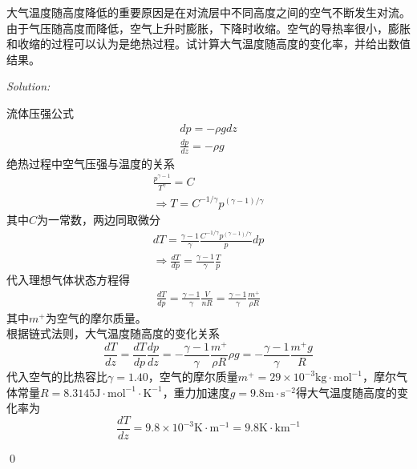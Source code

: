 \documentclass[12pt,a4paper]{article}
\newenvironment{problem}[2][Problem]{\begin{trivlist}
\item[\hskip \labelsep {\bfseries #1}\hskip \labelsep {\bfseries #2.}]}{\end{trivlist}}
\newenvironment{sol}
    {\emph{Solution:}
    }
    {
    \qed
    }
\begin{document}
\begin{problem}{1-11}
大气温度随高度降低的重要原因是在对流层中不同高度之间的空气不断发生对流。由于气压随高度而降低，空气上升时膨胀，下降时收缩。空气的导热率很小，膨胀和收缩的过程可以认为是绝热过程。试计算大气温度随高度的变化率，并给出数值结果。
\end{problem}
\begin{sol}
流体压强公式
\begin{gather}
dp=-\rho gdz\\
\frac{dp}{dz}=-\rho g
\end{gather}
绝热过程中空气压强与温度的关系
\begin{gather}
\frac{p^{\gamma-1}}{T^{\gamma}}=C\\
\Longrightarrow T=C^{-1/\gamma}p^{(\gamma-1)/\gamma}
\end{gather}
其中$C$为一常数，两边同取微分
\begin{gather}
dT=\frac{\gamma-1}{\gamma}\frac{C^{-1/\gamma}p^{(\gamma-1)/\gamma}}{p}dp\\
\Longrightarrow\frac{dT}{dp}=\frac{\gamma-1}{\gamma}\frac{T}{p}
\end{gather}
代入理想气体状态方程得
\begin{gather}
\frac{dT}{dp}=\frac{\gamma-1}{\gamma}\frac{V}{nR}=\frac{\gamma-1}{\gamma}\frac{m^+}{\rho R}
\end{gather}
其中$m^+$为空气的摩尔质量。\\
根据链式法则，大气温度随高度的变化关系
\begin{equation}
\frac{dT}{dz}=\frac{dT}{dp}\frac{dp}{dz}=-\frac{\gamma-1}{\gamma}\frac{m^+}{\rho R}\rho g=-\frac{\gamma-1}{\gamma}\frac{m^+g}{R}
\end{equation}
代入空气的比热容比$\gamma=1.40$，空气的摩尔质量$m^+=29\times10^{-3}\text{kg}\cdot\text{mol}^{-1}$，摩尔气体常量$R=8.3145\text{J}\cdot\text{mol}^{-1}\cdot\text{K}^{-1}$，重力加速度$g=9.8\text{m}\cdot\text{s}^{-2}$得大气温度随高度的变化率为
\begin{equation}
\frac{dT}{dz}=9.8\times10^{-3}\text{K}\cdot\text{m}^{-1}=9.8\text{K}\cdot\text{km}^{-1}
\end{equation}
\end{sol}
\end{document}
